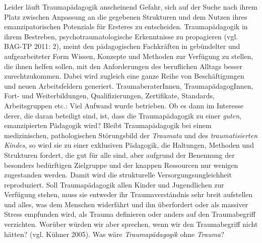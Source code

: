 Leider läuft Traumap{\"a}dagogik anscheinend Gefahr, sich auf der Suche nach ihrem Platz zwischen Anpassung an die gegebenen Strukturen und dem Nutzen ihres emanzipatorischen Potenzials für Ersteres zu entscheiden. Traumapädagogik in ihrem Bestreben, psychotraumatologische Erkenntnisse zu propagieren (vgl. BAG-TP 2011: 2), meint den pädagogischen Fachkräften in gebündelter und aufgearbeiteter Form Wissen, Konzepte und Methoden zur Verfügung zu stellen, die ihnen helfen sollen, mit den Anforderungen des beruflichen Alltags besser zurechtzukommen. Dabei wird zugleich eine ganze Reihe von Beschäftigungen und neuen Arbeitsfeldern generiert. TraumaberaterInnen, TraumapädagogInnen, Fort- und Weiterbildungen, Qualifizierungen, Zertifikate, Standards, Arbeitsgruppen etc.: Viel Aufwand wurde betrieben. Ob es dann im Interesse derer, die daran beteiligt sind, ist, dass die Traumap{\"a}dagogik zu einer \textit{guten}, emanzipierten Pädagogik wird? Bleibt Traumapädagogik bei einem medizinischen, pathologischen Störungsbild der \textit{Traumata} und des \textit{traumatisierten Kindes}, so wird sie zu einer exklusiven Pädagogik, die Haltungen, Methoden und Strukturen fordert, die gut für alle sind, aber aufgrund der Benennung der besonders bedürftigen Zielgruppe und der knappen Ressourcen nur wenigen zugestanden werden. Damit wird die strukturelle Versorgungsungleichheit reproduziert. Soll Traumapädagogik allen Kinder und Jugendlichen zur Verfügung stehen, muss sie entweder ihr Traumaverständnis sehr breit aufstellen und alles, was dem Menschen widerfährt und ihn überfordert oder als massiver Stress empfunden wird, als Trauma definieren oder anders auf den Traumabegriff verzichten. Worüber würden wir aber sprechen, wenn wir den Traumabegriff nicht hätten? (vgl. K{\"u}hner 2005). Was wäre \textit{Traumap{\"a}dagogik} ohne \textit{Trauma}?
